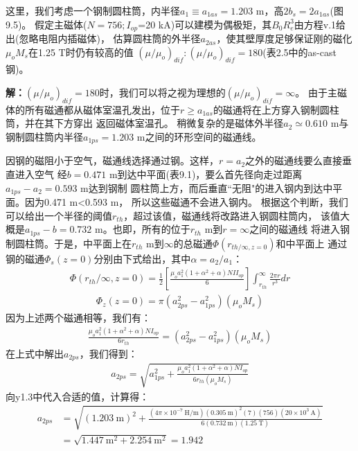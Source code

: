 这里，我们考虑一个钢制圆柱筒，内半径$a_1\equiv a_{1as}=1.203$ m，高$2b_s=2a_{1as}$(图9.5)。
假定主磁体($N=756;I_{op}$=20 kA)可以建模为偶极矩，其$B_0R_e^3$由方程v.1给出(忽略电阻内插磁体)，
估算圆柱筒的外半径$a_{2as}$，使其壁厚度足够保证刚的磁化$\mu_o M_s$在1.25 T时仍有较高的值
$(\mu/\mu_o)_{dif}:(\mu/\mu_o)_{dif}=180$(表2.5中的as-cast钢)。

\textbf{解：}$(\mu/\mu_o)_{dif}=180$时，我们可以将之视为理想的$(\mu/\mu_o)_{dif}=\infty$。
由于主磁体的所有磁通都从磁体室温孔发出，位于$r\ge a_{1as}$的磁通将在上方穿入钢制圆柱筒，并在其下方穿出
返回磁体室温孔。
稍微复杂的是磁体外半径$a_2\simeq0.610$ m与钢制圆柱筒内半径$a_{1ps}=1.203$ m之间的环形空间的磁通线。

因钢的磁阻小于空气，磁通线选择通过钢。这样，$r=a_2$之外的磁通线要么直接垂直进入空气
经$b=0.471$ m到达中平面(表9.1)，要么首先径向走过距离$a_{1ps}-a_2=0.593$ m达到钢制
圆柱筒上方，而后垂直``无阻"的进入钢内到达中平面。因为0.471 m<0.593 m，
所以这些磁通不会进入钢内。
根据这个判断，我们可以给出一个半径的阈值$r_{th}$，超过该值，磁通线将改路进入钢圆柱筒内，
该值大概是$a_{1ps}-b=0.732$ m。也即，所有的位于$r_{th}$ m到$r=\infty$之间的磁通线
将进入钢制圆柱筒。于是，中平面上在$r_{th}$ m到$\infty$的总磁通$\Phi(r_{th/\infty,z=0})$和中平面上
通过钢的磁通$\Phi_s(z=0)$分别由下式给出，其中$\alpha=a_2/a_1$：
\begin{align*}%
\Phi(r_{th}/\infty,z=0)=\frac{1}{2}[\frac{\mu_oa_1^2(1+\alpha^2+\alpha)NII_{op}}{6}]\int_{r_{th}}^{\infty}\frac{2\pi r}{r^3}dr \tag{y1.1a}
\end{align*}
\begin{align*}
\Phi_{z}(z=0)=\pi(a_{2ps}^2-a_{1ps}^2)(\mu_oM_s) \tag{y1.1b}
\end{align*}
因为上述两个磁通相等，我们有：
\begin{align*}%
\frac{\mu_oa_1^2(1+\alpha^2+\alpha)NI_{op}}{6r_{th}}=(a_{2ps}^2-a_{1ps}^2)(\mu_oM_s) \tag{y1.2}
\end{align*}
在上式中解出$a_{2ps}$，我们得到：
\begin{align*}%
a_{2ps}=\sqrt{a_{1ps}^2+\frac{\mu_oa_1^2(1+\alpha^2+\alpha)NI_{op}}{6r_{th}(\mu_oM_s)}} \tag{y1.3}
\end{align*}
向y1.3中代入合适的值，计算得：
\begin{align*}%
a_{2ps}&=\sqrt{(1.203\ \mathrm{m})^2+\frac{(4\pi\times 10^{-7}\ \mathrm{H/m})(0.305\ \mathrm{m})^2(7)(756)(20\times 10^3\ \mathrm{A})}{6(0.732\ \mathrm{m})(1.25\ \mathrm{T})}}\\
&=\sqrt{1.447\ \mathrm{m^2}+2.254\ \mathrm{m^2}}=1.942
\end{align*}


